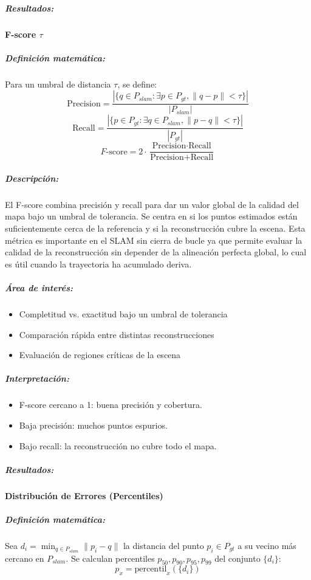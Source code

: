 \documentclass[12pt, a4paper, twoside]{article}
\begin{document}
\subparagraph{Resultados:}

\paragraph{F-score \(\tau\)}

\subparagraph{Definición matemática:}
Para un umbral de distancia $\tau$, se define:
\[
\text{Precision} = \frac{|\{ q \in P_{slam} : \exists p \in P_{gt}, \|q-p\| < \tau \}|}{|P_{slam}|}
\]
\[
\text{Recall} = \frac{|\{ p \in P_{gt} : \exists q \in P_{slam}, \|p-q\| < \tau \}|}{|P_{gt}|}
\]
\[
F\text{-score} = 2 \cdot \frac{\text{Precision} \cdot \text{Recall}}{\text{Precision} + \text{Recall}}
\]

\subparagraph{Descripción:}
El F-score combina precisión y recall para dar un valor global de la calidad del mapa bajo un umbral de tolerancia. 
Se centra en si los puntos estimados están suficientemente cerca de la referencia y si la reconstrucción cubre la escena.
Esta métrica es importante en el SLAM sin cierra de bucle ya que permite evaluar la calidad de la reconstrucción sin depender de la alineación 
perfecta global, lo cual es útil cuando la trayectoria ha acumulado deriva.

\subparagraph{Área de interés:}
\begin{itemize}
  \item Completitud vs. exactitud bajo un umbral de tolerancia
  \item Comparación rápida entre distintas reconstrucciones
  \item Evaluación de regiones críticas de la escena
\end{itemize}

\subparagraph{Interpretación:}
\begin{itemize}
  \item F-score cercano a 1: buena precisión y cobertura.  
  \item Baja precisión: muchos puntos espurios.
  \item Bajo recall: la reconstrucción no cubre todo el mapa.
\end{itemize}

\subparagraph{Resultados:}

\paragraph{Distribución de Errores (Percentiles)}

\subparagraph{Definición matemática:}
Sea $d_i = \min_{q \in P_{slam}} \|p_i - q\|$ la distancia del punto $p_i \in P_{gt}$ a su vecino más cercano en $P_{slam}$.  
Se calculan percentiles $p_{50}, p_{90}, p_{95}, p_{99}$ del conjunto $\{d_i\}$:
\[
p_x = \text{percentil}_x(\{ d_i \})
\]
\end{document}
